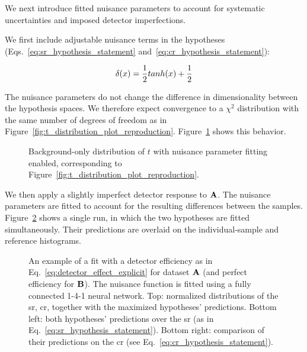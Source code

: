 \documentclass[paper/ddppaper2.tex]{subfiles}
\begin{document}
We next introduce fitted nuisance parameters to account for systematic uncertainties and imposed detector imperfections.

We first include adjustable nuisance terms in the hypotheses (Eqs.~\ref{eq:sr_hypothesis_statement} and~\ref{eq:cr_hypothesis_statement}):

\begin{equation}
\label{eq:detector_effect_explicit}
    \delta(\eventsymbol) = \dfrac{1}{2}tanh(\eventsymbol) + \dfrac{1}{2}
\end{equation}

The nuisance parameters do not change the difference in dimensionality between the hypothesis spaces. We therefore expect convergence to a $\chi^2$ distribution with the same number of degrees of freedom as in Figure~\ref{fig:t_distribution_plot_reproduction}. Figure~\ref{fig:blank-background-with-nuisance} shows this behavior.

\begin{figure}
    \caption{Background-only distribution of $t$ with nuisance parameter fitting enabled, corresponding to Figure~\ref{fig:t_distribution_plot_reproduction}.}
    \label{fig:blank-background-with-nuisance}
\end{figure}

We then apply a slightly imperfect detector response to ${\mathbf{A}}$. The nuisance parameters are fitted to account for the resulting differences between the samples. Figure~\ref{fig:detector_effect_with_nuisance_train} shows a single run, in which the two hypotheses are fitted simultaneously. Their predictions are overlaid on the individual-sample and reference histograms.

\begin{figure}
    \caption{An example of a fit with a detector efficiency as in Eq.~\ref{eq:detector_effect_explicit} for dataset ${\mathbf{A}}$ (and perfect efficiency for ${\mathbf{B}}$). The nuisance function is fitted using a fully connected 1-4-1 neural network. Top: normalized distributions of the \gls{sr}, \gls{cr}, together with the maximized hypotheses' predictions. Bottom left: both hypotheses' predictions over the \gls{sr} (as in Eq.~\ref{eq:sr_hypothesis_statement}). Bottom right: comparison of their predictions on the \gls{cr} (see Eq.~\ref{eq:cr_hypothesis_statement}).}
    \label{fig:detector_effect_with_nuisance_train}
\end{figure}
\end{document}
